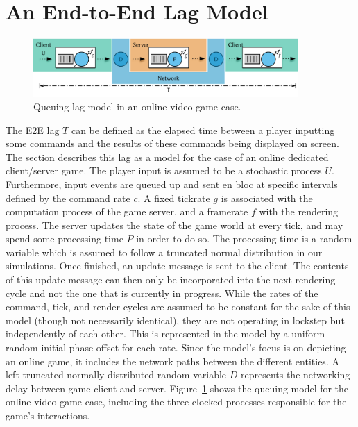 \section{An End-to-End Lag Model}
\label{sec:model}

\begin{figure}[!t]
	\centering
	\includegraphics[width=0.9\textwidth]{../../../models/e2e-lag-model.pdf}
	\caption{Queuing lag model in an online video game case.}
\label{fig:queuing-model}
\end{figure}

The \gls{E2E} lag $T$ can be defined as the elapsed time between a player inputting some commands and the results of these commands being displayed on screen. The section describes this lag as a model for the case of an online dedicated client/server game. The player input is assumed to be a stochastic process $U$. Furthermore, input events are queued up and sent en bloc at specific intervals defined by the command rate $c$. A fixed tickrate $g$ is associated with the computation process of the game server, and a framerate $f$ with the rendering process. The server updates the state of the game world at every tick, and may spend some processing time $P$ in order to do so. The processing time is a random variable which is assumed to follow a truncated normal distribution in our simulations. Once finished, an update message is sent to the client. The contents of this update message can then only be incorporated into the next rendering cycle and not the one that is currently in progress. While the rates of the command, tick, and render cycles are assumed to be constant for the sake of this model (though not necessarily identical), they are not operating in lockstep but independently of each other. This is represented in the model by a uniform random initial phase offset for each rate. Since the model's focus is on depicting an online game, it includes the network paths between the different entities. A left-truncated normally distributed random variable $D$ represents the networking delay between game client and server. Figure~\ref{fig:queuing-model} shows the queuing model for the online video game case, including the three clocked processes responsible for the game's interactions.


